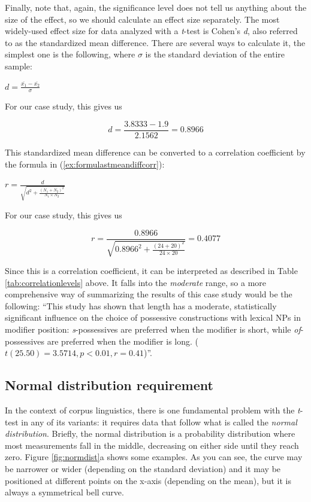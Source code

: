 Finally, note that, again, the significance level does not tell us anything about the size of the effect, so we should calculate an effect size separately. The most widely-used effect size for data analyzed with a \textit{t}-test is Cohen's \textit{d}, also referred to as the standardized mean difference. There are several ways to calculate it, the simplest one is the following, where $\sigma$ is the standard deviation of the entire sample:

\begin{exe}
\ex $\displaystyle{d = \frac{\overline{x_1} - \overline{x_2}}{\sigma}}$
\label{ex:formulastmeandiff}
\end{exe}

For our case study, this gives us

$$d =\frac{3.8333 - 1.9}{2.1562} = 0.8966$$

This standardized mean difference can be converted to a correlation coefficient by the formula in (\ref{ex:formulastmeandiffcorr}):

\begin{exe}
\ex $\displaystyle{r = \frac d{\sqrt{d^2 + \frac{(N_1 + N_2)^2}{N_1 \times  N_2}}}}$ 
\label{ex:formulastmeandiffcorr}
\end{exe}

For our case study, this gives us

$$r = \frac{0.8966}{\sqrt{0.8966^2 + \frac{(24 + 20)^2}{24 \times  20}}} = 0.4077$$

Since this is a correlation coefficient, it can be interpreted as described in Table \ref{tab:correlationlevels} above. It falls into the \textit{moderate} range, so a more comprehensive way of summarizing the results of this case study would be the following: ``This study has shown that length has a moderate, statistically significant influence on the choice of possessive constructions with lexical NPs in modifier position: \textit{s}-possessives are preferred when the modifier is short, while \textit{of}-possessives are preferred when the modifier is long. ($t(25.50) = 3.5714, p < 0.01, r = 0.41$)''.

\subsection{Normal distribution requirement}
\label{sec:normaldistribution}

In the context of corpus linguistics, there is one fundamental problem with the \textit{t}-test in any of its variants: it requires data that follow what is called the \textit{normal distribution}. Briefly, the normal distribution is a probability distribution where most measurements fall in the middle, decreasing on either side until they reach zero. Figure \ref{fig:normdist}a shows some examples. As you can see, the curve may be narrower or wider (depending on the standard deviation) and it may be positioned at different points on the x-axis (depending on the mean), but it is always a symmetrical bell curve.

